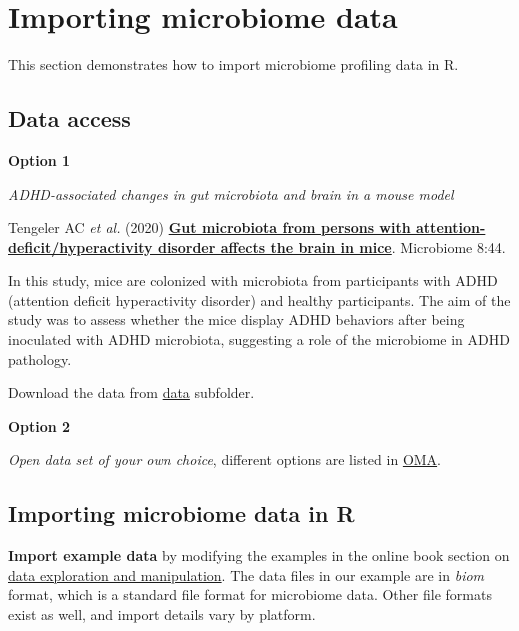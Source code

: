 \documentclass[
  oneside]{book}
\begin{document}
\hypertarget{importing-microbiome-data}{%
\chapter{Importing microbiome data}\label{importing-microbiome-data}}

This section demonstrates how to import microbiome profiling data in R.

\hypertarget{data-access}{%
\section{Data access}\label{data-access}}

\textbf{Option 1}

\emph{ADHD-associated changes in gut microbiota and brain in a mouse model}

Tengeler AC \emph{et
al.} (2020) \href{https://doi.org/10.1186/s40168-020-00816-x}{\textbf{Gut microbiota from persons with
attention-deficit/hyperactivity disorder affects the brain in
mice}}. Microbiome
8:44.

In this study, mice are colonized with microbiota from participants
with ADHD (attention deficit hyperactivity disorder) and healthy
participants. The aim of the study was to assess whether the mice
display ADHD behaviors after being inoculated with ADHD microbiota,
suggesting a role of the microbiome in ADHD pathology.

Download the data from
\href{https://github.com/microbiome/course_2022_radboud/tree/main/data}{data}
subfolder.

\textbf{Option 2}

\emph{Open data set of your own choice}, different options are listed in \href{https://microbiome.github.io/OMA/containers.html\#example-data}{OMA}.

\hypertarget{importing-microbiome-data-in-r}{%
\section{Importing microbiome data in R}\label{importing-microbiome-data-in-r}}

\textbf{Import example data} by modifying the examples in the online book
section on \href{https://microbiome.github.io/OMA/data-introduction.html\#loading-experimental-microbiome-data}{data exploration and
manipulation}. The
data files in our example are in \emph{biom} format, which is a standard
file format for microbiome data. Other file formats exist as well, and
import details vary by platform.
\end{document}
